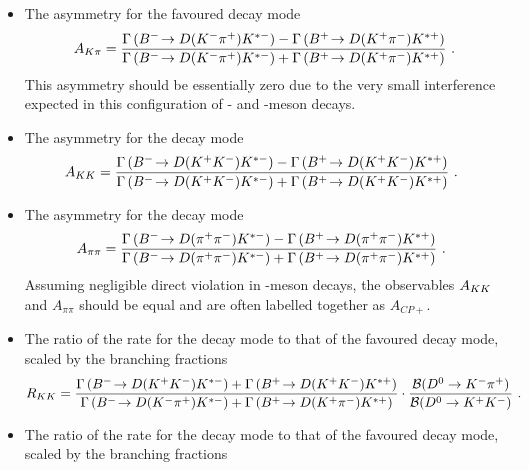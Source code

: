 \begin{itemize}
\item{The \CP asymmetry for the favoured decay mode
{\footnotesize
\begin{equation}
A_{{K}\pi} = \frac{\Gamma\left({{{B}^-}}\!\rightarrow {\ensuremath{D}}({{K}^-}{{\pi}^+}){{K}^{*-}}\right) - \Gamma\left({{{B}^+}}\!\rightarrow {\ensuremath{D}}({{K}^+}{{\pi}^-}){{K}^{*+}}\right)}{\Gamma\left({{{B}^-}}\!\rightarrow {\ensuremath{D}}({{K}^-}{{\pi}^+}){{K}^{*-}}\right) + \Gamma\left({{{B}^+}}\!\rightarrow {\ensuremath{D}}({{K}^+}{{\pi}^-}){{K}^{*+}}\right)} \text{ .}
\label{eqn:Akpi}
\end{equation}}%
\noindent%
This asymmetry should be essentially zero due to the very small interference expected in this configuration of \B- and \D-meson decays.
}
\item{The \CP asymmetry for the \decay{\D}{\Kp\Km} decay mode
{\footnotesize
\begin{equation}
A_{{K}{K}} = \frac{\Gamma\left({{{B}^-}}\!\rightarrow {\ensuremath{D}}({{K}^+}{{K}^-}){{K}^{*-}}\right) - \Gamma\left({{{B}^+}}\!\rightarrow {\ensuremath{D}}({{K}^+}{{K}^-}){{K}^{*+}}\right)}{\Gamma\left({{{B}^-}}\!\rightarrow {\ensuremath{D}}({{K}^+}{{K}^-}){{K}^{*-}}\right) + \Gamma\left({{{B}^+}}\!\rightarrow {\ensuremath{D}}({{K}^+}{{K}^-}){{K}^{*+}}\right)} \text{ . }
\label{eqn:Akk}
\end{equation}
}}
\item{The \CP asymmetry for the \decay{\D}{\pip\pim} decay mode
{\footnotesize
\begin{equation}
A_{\pi\pi} = \frac{\Gamma\left({{{B}^-}}\!\rightarrow {\ensuremath{D}}({{\pi}^+}{{\pi}^-}){{K}^{*-}}\right) - \Gamma\left({{{B}^+}}\!\rightarrow {\ensuremath{D}}({{\pi}^+}{{\pi}^-}){{K}^{*+}}\right)}{\Gamma\left({{{B}^-}}\!\rightarrow {\ensuremath{D}}({{\pi}^+}{{\pi}^-}){{K}^{*-}}\right) + \Gamma\left({{{B}^+}}\!\rightarrow {\ensuremath{D}}({{\pi}^+}{{\pi}^-}){{K}^{*+}}\right)} \text{ . }
\label{eqn:Apipi}
\end{equation}}
}
Assuming negligible direct \CP violation in \D-meson decays, the observables $A_{{K}{K}}$ and $A_{\pi\pi}$ should be equal and are often labelled together as $A_{CP+}$.
\item{The ratio of the rate for the \decay{\D}{\Kp\Km} decay mode to that of the favoured decay mode, scaled by the branching fractions
{\footnotesize
\begin{equation}
R_{{K}{K}} = \frac{\Gamma\left({{{B}^-}}\!\rightarrow {\ensuremath{D}}({{K}^+}{{K}^-}){{K}^{*-}}\right) + \Gamma\left({{{B}^+}}\!\rightarrow {\ensuremath{D}}({{K}^+}{{K}^-}){{K}^{*+}}\right)}{\Gamma\left({{{B}^-}}\!\rightarrow {\ensuremath{D}}({{K}^-}{{\pi}^+}){{K}^{*-}}\right) + \Gamma\left({{{B}^+}}\!\rightarrow {\ensuremath{D}}({{K}^+}{{\pi}^-}){{K}^{*+}}\right)} \cdot \frac{{\mathcal{B}}(D^0 \rightarrow K^-\pi^+)}{{\mathcal{B}}(D^0 \rightarrow K^+K^-)} \text{ . }
\label{eqn:Rkk}
\end{equation}
}}
\item{The ratio of the rate for the \decay{\D}{\pip\pim} decay mode to that of the favoured decay mode, scaled by the branching fractions
}
\end{itemize}
